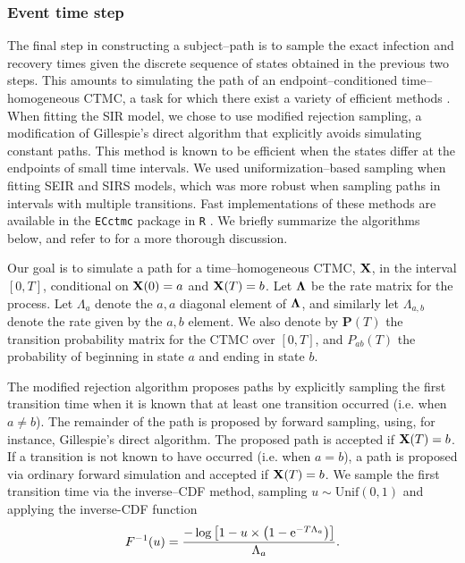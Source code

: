\subsubsection{Event time step}
The final step in constructing a subject--path is to sample the exact infection and recovery times given the discrete sequence of states obtained in the previous two steps. This amounts to simulating the path of an endpoint--conditioned time--homogeneous CTMC, a task for which there exist a variety of efficient methods \cite{hobolth2009}. When fitting the SIR model, we chose to use modified rejection sampling, a modification of Gillespie's direct algorithm \cite{gillespie1976general} that explicitly avoids simulating constant paths. This method is known to be efficient when the states differ at the endpoints of small time intervals. We used uniformization--based sampling \cite{hobolth2009} when fitting SEIR and SIRS models, which was more robust when sampling paths in intervals with multiple transitions. Fast implementations of these methods are available in the \texttt{ECctmc} package in \texttt{R} \cite{ECctmc}. We briefly summarize the algorithms below, and refer to \cite{hobolth2009} for a more thorough discussion.   

Our goal is to simulate a path for a time--homogeneous CTMC, $ \mathbf{X} $, in the interval $ [0,T] $, conditional on $ \mathbf{X}(0) = a $ and $ \mathbf{X}(T) = b $. Let $ \boldsymbol{\Lambda} $ be the rate matrix for the process. Let $ \Lambda_{a} $ denote the $ a,a $ diagonal element of $ \boldsymbol{\Lambda} $, and similarly let $ \Lambda_{a,b} $ denote the rate given by the $ a,b $ element. We also denote by $ \mathbf{P}(T) $ the transition probability matrix for the CTMC over $ [0,T] $, and $ P_{ab}(T) $ the probability of beginning in state $ a $ and ending in state $ b $.

The modified rejection algorithm proposes paths by explicitly sampling the first transition time when it is known that at least one transition occurred (i.e. when $ a  \neq b $). The remainder of the path is proposed by forward sampling, using, for instance, Gillespie's direct algorithm. The proposed path is accepted if $ \mathbf{X}(T) = b $. If a transition is not known to have occurred (i.e. when $ a = b $), a path is proposed via ordinary forward simulation and accepted if $ \mathbf{X}(T) = b $. We sample the first transition time via the inverse--CDF method, sampling $ u\sim \mathrm{Unif}(0,1) $ and applying the inverse-CDF function 
\begin{equation} F^{-1}(u) = \frac{-\log\left [1 - u \times \left (1 - \mathrm{e}^{-T\Lambda_a}\right )\right ]}{\Lambda_a}. 
\end{equation}

